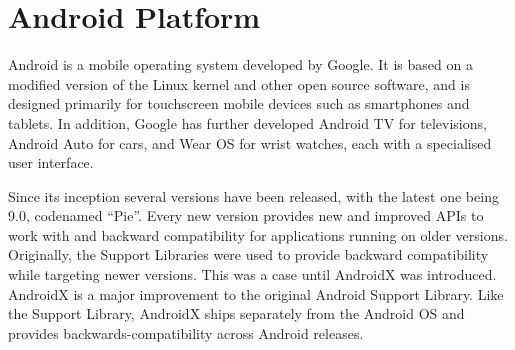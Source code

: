 \documentclass[thesis=B,english]{FITthesis}[2012/10/20]
\begin{document}
	\section{Android Platform}
Android is a mobile operating system developed by Google. It is based on a modified version of the Linux kernel and other open source software, and is designed primarily for touchscreen mobile devices such as smartphones and tablets. In addition, Google has further developed Android TV for televisions, Android Auto for cars, and Wear OS for wrist watches, each with a specialised user interface.

Since its inception several versions have been released, with the latest one being 9.0, codenamed \enquote{Pie}. Every new version provides new and improved APIs to work with and backward compatibility for applications running on older versions. Originally, the Support Libraries were used to provide backward compatibility while targeting newer versions. This was a case until AndroidX was introduced.
AndroidX is a major improvement to the original Android Support Library. Like the Support Library, AndroidX ships separately from the Android OS and provides backwards-compatibility across Android releases. 
\end{document}
